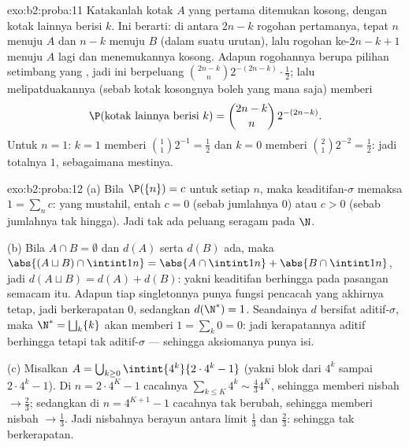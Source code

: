 \begin{solution}{exo:b2:proba:11}
Katakanlah kotak $A$ yang pertama ditemukan kosong, dengan kotak
lainnya berisi $k$. Ini berarti: di antara $2n - k$
rogohan pertamanya, tepat $n$ menuju $A$ dan $n - k$ menuju $B$ (dalam suatu
urutan), lalu rogohan ke-$2n - k + 1$ menuju $A$ lagi
dan menemukannya kosong. Adapun rogohannya berupa pilihan setimbang yang ,
jadi  ini berpeluang
$\binom{2n-k}{n}2^{-(2n-k)}\cdot\frac12$; lalu melipatduakannya (sebab kotak
kosongnya boleh yang mana saja) memberi
\[
\P(\text{kotak lainnya berisi }k) = \binom{2n-k}{n}\,2^{-(2n-k)} .
\]
Untuk $n = 1$: $k = 1$ memberi $\binom11 2^{-1} = \frac12$ dan $k
= 0$ memberi $\binom21 2^{-2} = \frac12$: jadi totalnya $1$, sebagaimana
mestinya.
\end{solution}

\begin{solution}{exo:b2:proba:12}
(a) Bila $\P(\{n\}) = c$ untuk setiap $n$, maka keaditifan-$\sigma$
memaksa $1 = \sum_nc$: yang mustahil, entah $c = 0$ (sebab jumlahnya $0$)
atau $c > 0$ (sebab jumlahnya tak hingga). Jadi tak ada peluang seragam pada
$\N$.

(b) Bila $A \cap B = \emptyset$ dan $d(A)$ serta $d(B)$ ada, maka
$\abs{(A \sqcup B)\cap\intint1n} = \abs{A\cap\intint1n} +
\abs{B\cap\intint1n}$, jadi $d(A \sqcup B) = d(A) + d(B)$:
yakni keaditifan berhingga pada pasangan semacam itu. Adapun tiap singletonnya punya fungsi
pencacah yang akhirnya tetap, jadi berkerapatan $0$, sedangkan
$d(\N^*) = 1$. Seandainya $d$ bersifat aditif-$\sigma$, maka $\N^* =
\bigsqcup_k\{k\}$ akan memberi $1 = \sum_k 0 = 0$: jadi kerapatannya
aditif berhingga tetapi tak aditif-$\sigma$ --- sehingga aksiomanya punya
isi.

(c) Misalkan $A = \bigcup_{k\geq0}\intint{4^k}{2\cdot4^k - 1}$
(yakni blok dari $4^k$ sampai $2\cdot4^k - 1$). Di $n = 2\cdot4^K -
1$ cacahnya $\sum_{k\leq K}4^k \sim \frac43 4^K$, sehingga memberi
nisbah $\to \frac23$; sedangkan di $n = 4^{K+1} - 1$ cacahnya
tak berubah, sehingga memberi nisbah $\to \frac13$. Jadi nisbahnya berayun
antara limit $\frac13$ dan $\frac23$: sehingga tak berkerapatan.
\end{solution}

